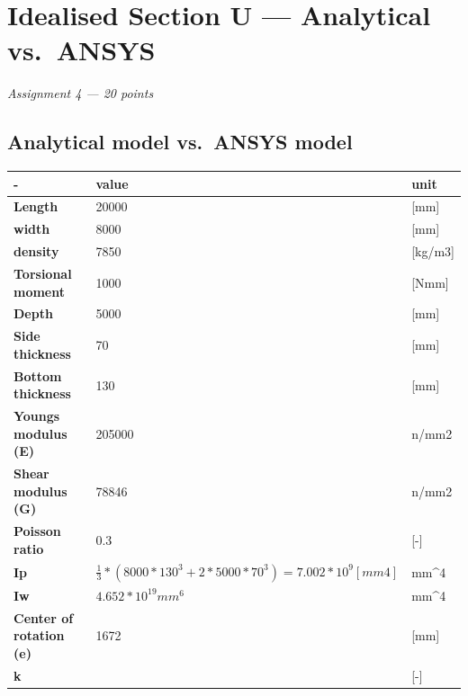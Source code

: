 \chapter{Idealised Section U --- Analytical vs.\ ANSYS}
\label{ch:assignment4}

\begingroup\itshape Assignment 4 --- 20 points\endgroup


\bigskip


\section{Analytical model vs.\ ANSYS model}
\label{sec:a4-1}

\begin{table}[h]
\begin{tabular}{|l|l|l|}
\hline
-                         & \textbf{value} & \textbf{unit} \\ \hline
\textbf{Length}           & 20000          & {[}mm{]}      \\ \hline
\textbf{width}            & 8000           & {[}mm{]}      \\ \hline
\textbf{density}          & 7850          & {[}kg/m3{]}  \\ \hline
\textbf{Torsional moment} & 1000           & {[}Nmm{]}     \\ \hline
\textbf{Depth}            & 5000           & {[}mm{]}      \\ \hline
\textbf{Side thickness}   & 70             & {[}mm{]}      \\ \hline
\textbf{Bottom thickness} & 130            & {[}mm{]}      \\ \hline
\textbf{Youngs modulus (E)}   & 205000         & n/mm2         \\ \hline
\textbf{Shear modulus (G)}   & 78846         & n/mm2         \\ \hline
\textbf{Poisson ratio}    & 0.3            & {[}-{]}       \\ \hline
\textbf{Ip}    &    $\tfrac13*(8000*130^3+2*5000*70^3) = 7.002*10^9 [mm4]$      &    mm^4  \\ \hline
\textbf{Iw}    &  $4.652*10^{19}mm^6$      &    mm^4  \\ \hline
\textbf{Center of rotation (e)}    & 1672            & {[mm]}       \\ \hline
\textbf{k}    &  & {[-]}       \\ \hline
\end{tabular}
\end{table}

